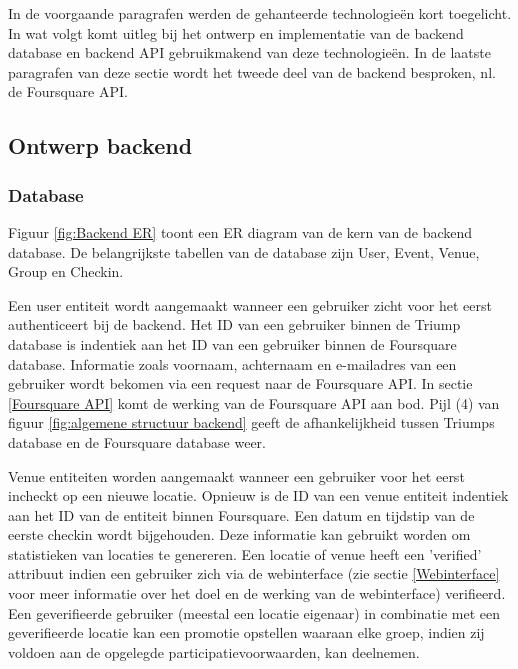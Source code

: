 In de voorgaande paragrafen werden de gehanteerde technologieën kort toegelicht. In wat volgt komt uitleg bij het ontwerp en implementatie van de backend database en backend API gebruikmakend van deze technologieën. In de laatste paragrafen van deze sectie wordt het tweede deel van de backend besproken, nl. de Foursquare API.
  
\subsection{Ontwerp backend}


\subsubsection{Database}

Figuur \ref{fig:Backend ER} toont een ER diagram van de kern van de backend database. De belangrijkste tabellen van de database zijn User, Event, Venue, Group en Checkin. 

Een user entiteit wordt aangemaakt wanneer een gebruiker zicht voor het eerst authenticeert bij de backend. Het ID van een gebruiker binnen de Triump database is indentiek aan het ID van een gebruiker binnen de Foursquare database. Informatie zoals voornaam, achternaam en e-mailadres van een gebruiker wordt bekomen via een request naar de Foursquare API. In sectie \ref{Foursquare API} komt de werking van de Foursquare API aan bod. Pijl (4) van figuur \ref{fig:algemene structuur backend} geeft de afhankelijkheid tussen Triumps database en de Foursquare database weer.

Venue entiteiten worden aangemaakt wanneer een gebruiker voor het eerst incheckt op een nieuwe locatie. Opnieuw is de ID van een venue entiteit indentiek aan het ID van de entiteit binnen Foursquare. Een datum en tijdstip van de eerste checkin wordt bijgehouden. Deze informatie kan gebruikt worden om statistieken van locaties te genereren. Een locatie of venue heeft een 'verified' attribuut indien een gebruiker zich via de webinterface (zie sectie \ref{Webinterface} voor meer informatie over het doel en de werking van de webinterface) verifieerd. Een geverifieerde gebruiker (meestal een locatie eigenaar) in combinatie met een geverifieerde locatie kan een promotie opstellen waaraan elke groep, indien zij voldoen aan de opgelegde participatievoorwaarden, kan deelnemen.

